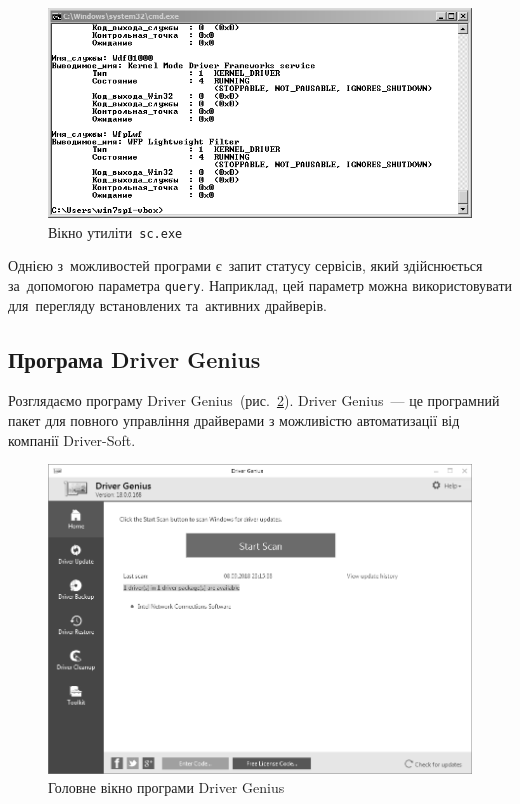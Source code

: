 \documentclass[
	a4paper,
	oneside,
	DIV = 12,
	12pt,
	headings = normal,
]{scrartcl}
\newcommand{\progname}[1]{\texttt{#1}}
\begin{document}
			\begin{figure}[!htb]
				\centering
				\includegraphics[height = 6\baselineskip]{./assets/y03s01-syssoft-lab-01-scr-04-scexe-bw.png}
				\caption{Вікно утиліти~\progname{sc.exe}}
				\label{fig:04-scexe}
			\end{figure}
			
			Однією з~можливостей програми є~запит статусу сервісів, який здійснюється за~допомогою параметра \texttt{query}. Наприклад, цей параметр можна використовувати для~перегляду встановлених та~активних драйверів.

		\subsection{Програма Driver Genius}
			Розглядаємо програму Driver Genius~(рис.~\ref{fig:05-driver-genius}). Driver Genius~— це програмний пакет для повного управління драйверами з можливістю автоматизації від компанії Driver-Soft.

			\begin{figure}[!htbp]
				\centering
				\includegraphics[height = 12\baselineskip]{./assets/y03s01-syssoft-lab-01-scr-05-drivergenius-bw.png}
				\caption{Головне вікно програми Driver Genius}
				\label{fig:05-driver-genius}
			\end{figure}
\end{document}
